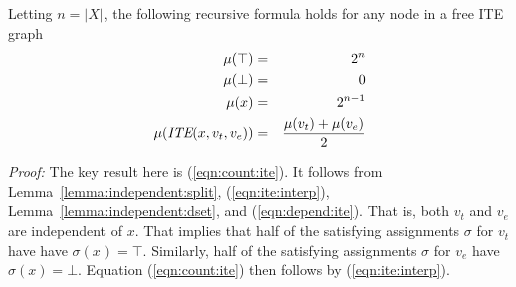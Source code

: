 \documentclass{llncs}
\newcommand{\tautology}{\top}
\newcommand{\nil}{\bot}
\newcommand{\ite}{\mbox{\it ITE}}
\newcommand{\interp}{\sigma}
\newcommand{\mcount}{\mu}
\begin{document}
\begin{theorem}
\label{theorem:count}
Letting $n = |X|$, the following recursive formula holds for any node in a free ITE graph
\begin{eqnarray}
\mcount(\tautology) & = & 2^{n} \label{eqn:count:true}\\
\mcount(\nil) & = & 0 \label{eqn:count:false}\\
\mcount(x) & = & 2^{n-1} \label{eqn:count:variable}\\
\mcount(\ite(x, v_t, v_e)) & = & \frac{\mcount(v_t) + \mcount(v_e)}{2} \label{eqn:count:ite}
\end{eqnarray}  
\end{theorem}
\noindent
{\em Proof:} The key result here is (\ref{eqn:count:ite}).  It follows
from Lemma~\ref{lemma:independent:split}, (\ref{eqn:ite:interp}),
Lemma~\ref{lemma:independent:dset}, and (\ref{eqn:depend:ite}).  That is, both
$v_t$ and $v_e$ are independent of $x$.  That implies that half of the
satisfying assignments $\interp$ for $v_t$ have have $\interp(x) =
\tautology$.  Similarly, half of the satisfying assignments $\interp$
for $v_e$ have $\interp(x) = \nil$.  Equation (\ref{eqn:count:ite}) then follows by (\ref{eqn:ite:interp}).


\end{document}
